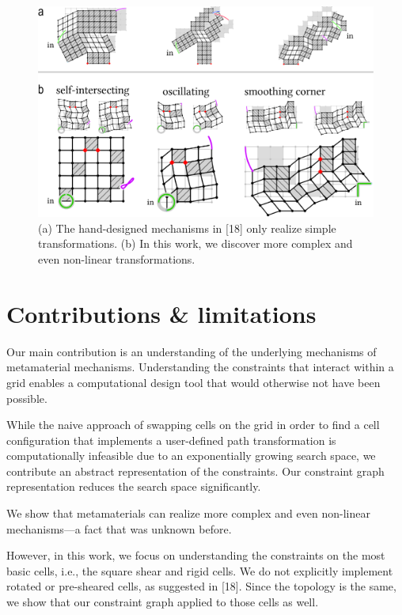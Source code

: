 \begin{figure} [h]
    \includegraphics[width=\textwidth]{chapters/understanding-metamaterial-mechanisms-FIG/6-compare-old-and-new-mechanisms.png}
    \caption[Short figure name.]{(a) The hand-designed mechanisms in [18] only realize simple transformations. (b) In this work, we discover more complex and even non-linear transformations.
    \label{fig:6-compare-old-and-new-mechanisms}}
\end{figure}


\section{Contributions \& limitations}

Our main contribution is an understanding of the underlying mechanisms of metamaterial mechanisms. Understanding the constraints that interact within a grid enables a computational design tool that would otherwise not have been possible.

While the naive approach of swapping cells on the grid in order to find a cell configuration that implements a user-defined path transformation is computationally infeasible due to an exponentially growing search space, we contribute an abstract representation of the constraints. Our constraint graph representation reduces the search space significantly. 

We show that metamaterials can realize more complex and even non-linear mechanisms---a fact that was unknown before.

However, in this work, we focus on understanding the constraints on the most basic cells, i.e., the square shear and rigid cells. We do not explicitly implement rotated or pre-sheared cells, as suggested in [18]. Since the topology is the same, we show that our constraint graph applied to those cells as well. 


